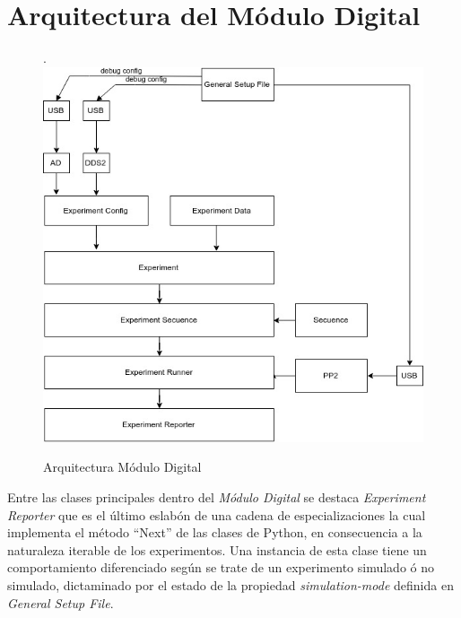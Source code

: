\section{Arquitectura del M\'odulo Digital}
\begin{figure}[!htb].
    \includegraphics[width=\linewidth]{../figures/d19.jpg}
    \caption{Arquitectura M\'odulo Digital}
    \label{fig:d19}
\end{figure}

Entre las clases principales dentro del \textit{M\'odulo Digital} se destaca \textit{Experiment Reporter}
que es el \'ultimo eslab\'on de una cadena de especializaciones la cual implementa el m\'etodo \enquote{Next} de las clases
de Python, en consecuencia a la naturaleza iterable de los experimentos. 
Una instancia de esta clase tiene un comportamiento diferenciado seg\'un se trate de un experimento simulado \'o no simulado, dictaminado por el estado de la propiedad \textit{simulation-mode} definida en \textit{General Setup File}.

\newpage
